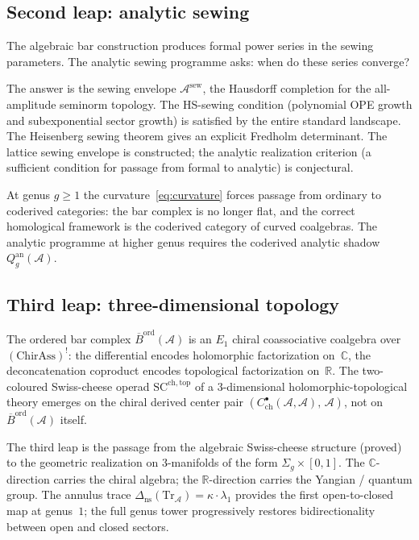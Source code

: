 \documentclass[11pt,reqno]{amsart}
\theoremstyle{definition}
\theoremstyle{remark}
\providecommand{\cA}{\mathcal{A}}
\providecommand{\barB}{\overline{B}}
\numberwithin{equation}{section}
\begin{document}
\subsection{Second leap: analytic sewing}
\label{ssec:sewing-frontier}

The algebraic bar construction produces formal power
series in the sewing parameters. The analytic sewing
programme asks: when do these series converge?

The answer is the sewing envelope $\cA^{\mathrm{sew}}$,
the Hausdorff completion for the all-amplitude seminorm
topology. The HS-sewing condition (polynomial OPE growth
and subexponential sector growth) is satisfied by the
entire standard landscape. The Heisenberg sewing theorem
gives an explicit Fredholm determinant. The lattice
sewing envelope is constructed; the analytic realization
criterion (a sufficient condition for passage from
formal to analytic) is conjectural.

At genus $g \ge 1$ the curvature~\eqref{eq:curvature}
forces passage from ordinary to coderived categories:
the bar complex is no longer flat, and the correct
homological framework is the coderived category of
curved coalgebras. The analytic programme at higher genus
requires the coderived analytic shadow
$Q_g^{\mathrm{an}}(\cA)$.


\subsection{Third leap: three-dimensional topology}
\label{ssec:3d}

The ordered bar complex
$\barB^{\mathrm{ord}}(\cA)$ is an $E_1$ chiral
coassociative coalgebra over $(\mathrm{ChirAss})^!$:
the differential encodes holomorphic factorization
on~$\mathbb{C}$, the deconcatenation coproduct encodes
topological factorization on~$\mathbb{R}$. The
two-coloured Swiss-cheese operad
$\mathrm{SC}^{\mathrm{ch,top}}$ of a $3$-dimensional
holomorphic-topological theory emerges on the chiral
derived center pair
$(C^\bullet_{\mathrm{ch}}(\cA,\cA),\, \cA)$, not
on~$\barB^{\mathrm{ord}}(\cA)$ itself.

The third leap is the passage from the algebraic
Swiss-cheese structure (proved) to the geometric
realization on $3$-manifolds of the form
$\Sigma_g \times [0,1]$. The $\mathbb{C}$-direction
carries the chiral algebra; the $\mathbb{R}$-direction
carries the Yangian / quantum group. The annulus trace
$\Delta_{\mathrm{ns}}(\mathrm{Tr}_\cA) =
\kappa \cdot \lambda_1$
provides the first open-to-closed map at genus~$1$;
the full genus tower progressively restores
bidirectionality between open and closed sectors.
\end{document}

